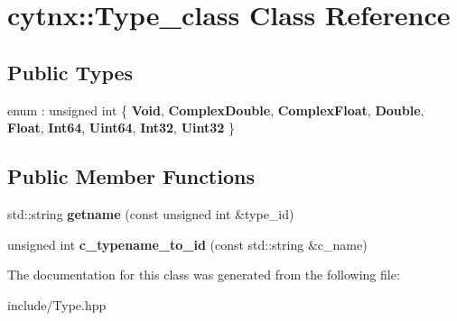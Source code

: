 \hypertarget{classcytnx_1_1Type__class}{}\section{cytnx\+:\+:Type\+\_\+class Class Reference}
\label{classcytnx_1_1Type__class}
\subsection*{Public Types}
\begin{DoxyCompactItemize}
\item 
\mbox{\label{classcytnx_1_1Type__class_a45e8473b573a1ff9b52ce5d551a74a49}} 
enum \+: unsigned int \{ \newline
{\bfseries Void}, 
{\bfseries Complex\+Double}, 
{\bfseries Complex\+Float}, 
{\bfseries Double}, 
\newline
{\bfseries Float}, 
{\bfseries Int64}, 
{\bfseries Uint64}, 
{\bfseries Int32}, 
\newline
{\bfseries Uint32}
 \}
\end{DoxyCompactItemize}
\subsection*{Public Member Functions}
\begin{DoxyCompactItemize}
\item 
\mbox{\label{classcytnx_1_1Type__class_a3fd54e061542e62073c774065ad5f9fd}} 
std\+::string {\bfseries getname} (const unsigned int \&type\+\_\+id)
\item 
\mbox{\label{classcytnx_1_1Type__class_a96ba80c06bc7eeaa8ecbc93b11660b0f}} 
unsigned int {\bfseries c\+\_\+typename\+\_\+to\+\_\+id} (const std\+::string \&c\+\_\+name)
\end{DoxyCompactItemize}


The documentation for this class was generated from the following file\+:\begin{DoxyCompactItemize}
\item 
include/Type.\+hpp\end{DoxyCompactItemize}
